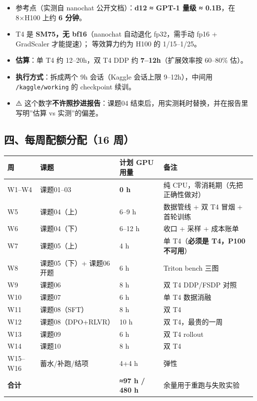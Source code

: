 \documentclass[
  chinese,
  11pt,
]{ctexart}
\newcounter{none} %
\providecommand{\tightlist}{%
  \setlength{\itemsep}{0pt}\setlength{\parskip}{0pt}}
\begin{document}
\begin{itemize}
\tightlist
\item
  参考点（实测自 nanochat 公开文档）：\textbf{d12 ≈ GPT-1 量级 ≈ 0.1B}，在 8×H100 上约 \textbf{6 分钟}。
\item
  T4 是 \textbf{SM75，无 bf16}（nanochat 自动退化 fp32，需手动 fp16 + GradScaler 才能提速）； 等效算力约为 H100 的 1/15--1/25。
\item
  \textbf{估算}：单 T4 约 12--20h，双 T4 DDP 约 \textbf{7--12h}（扩展效率按 60--80\% 估）。
\item
  \textbf{执行方式}：拆成两个 9h 会话（Kaggle 会话上限 9--12h），中间用 \texttt{/kaggle/working} 的 checkpoint 续训。
\item
  ⚠️ 这个数字\textbf{不许照抄进报告}：课题04 结束后，用实测耗时替换，并在报告里写明''估算 vs 实测''的偏差。
\end{itemize}

\subsection{四、每周配额分配（16 周）}\label{ux56dbux6bcfux5468ux914dux989dux5206ux914d16-ux5468}

{\def\LTcaptype{none} %
\begin{longtable}[]{@{}llll@{}}
\toprule\noalign{}
周 & 课题 & 计划 GPU 用量 & 备注 \\
\midrule\noalign{}
\endhead
\bottomrule\noalign{}
\endlastfoot
W1--W4 & 课题01--03 & \textbf{0 h} & 纯 CPU，零消耗期（先把正确性做对） \\
W5 & 课题04（上） & 6--9 h & 数据管线 + 双 T4 冒烟 + 首轮训练 \\
W6 & 课题04（下） & 6--12 h & 收口 + 采样 + 成本账单 \\
W7 & 课题05（上） & 4 h & 单 T4（\textbf{必须是 T4，P100 不可用}） \\
W8 & 课题05（下）+ 课题06 开题 & 6 h & Triton bench 三图 \\
W9 & 课题06 & 8 h & 双 T4 DDP/FSDP 对照 \\
W10 & 课题07 & 6 h & 单 T4 数据消融 \\
W11 & 课题08（SFT） & 8 h & 双 T4 \\
W12 & 课题08（DPO+RLVR） & 10 h & 双 T4，最贵的一周 \\
W13 & 课题09 & 6 h & 双 T4 rollout \\
W14 & 课题10 & 8 h & 双 T4 \\
W15--W16 & 蓄水/补跑/结项 & 4+4 h & 弹性 \\
\textbf{合计} & & \textbf{≈97 h / 480 h} & 余量用于重跑与失败实验 \\
\end{longtable}
}
\end{document}
